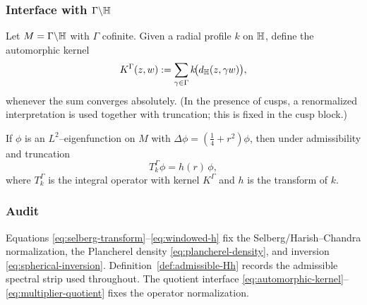 \subsubsection{Interface with $\Gamma\backslash\mathbb{H}$}\label{subsec:pretrace-interface}

Let $M=\Gamma\backslash\mathbb{H}$ with $\Gamma$ cofinite.
Given a radial profile $k$ on $\mathbb{H}$, define the automorphic kernel
\begin{equation}\label{eq:automorphic-kernel}
K^\Gamma(z,w):=\sum_{\gamma\in\Gamma} k\!\bigl(d_{\mathbb{H}}(z,\gamma w)\bigr),
\end{equation}
whenever the sum converges absolutely. (In the presence of cusps, a renormalized
interpretation is used together with truncation; this is fixed in the cusp block.)

If $\phi$ is an $L^2$--eigenfunction on $M$ with $\Delta\phi=(\frac14+r^2)\phi$, then under admissibility and truncation
\begin{equation}\label{eq:multiplier-quotient}
T_k^\Gamma\phi=h(r)\,\phi,
\end{equation}
where $T_k^\Gamma$ is the integral operator with kernel $K^\Gamma$ and $h$ is the transform of $k$.

\subsubsection*{Audit}\label{rem:selberg-audit}
Equations \eqref{eq:selberg-transform}--\eqref{eq:windowed-h} fix the Selberg/Harish--Chandra normalization,
the Plancherel density \eqref{eq:plancherel-density}, and inversion \eqref{eq:spherical-inversion}.
Definition~\ref{def:admissible-Hh} records the admissible spectral strip used throughout.
The quotient interface \eqref{eq:automorphic-kernel}--\eqref{eq:multiplier-quotient} fixes the operator normalization.
